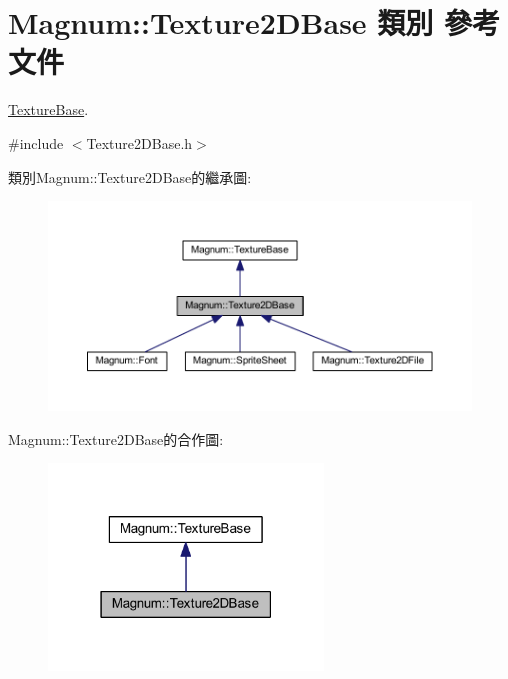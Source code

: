 \hypertarget{class_magnum_1_1_texture2_d_base}{}\section{Magnum\+:\+:Texture2\+D\+Base 類別 參考文件}
\label{class_magnum_1_1_texture2_d_base}


\hyperlink{class_magnum_1_1_texture_base}{Texture\+Base}.  




{\ttfamily \#include $<$Texture2\+D\+Base.\+h$>$}



類別\+Magnum\+:\+:Texture2\+D\+Base的繼承圖\+:\nopagebreak
\begin{figure}[H]
\begin{center}
\leavevmode
\includegraphics[width=350pt]{class_magnum_1_1_texture2_d_base__inherit__graph}
\end{center}
\end{figure}


Magnum\+:\+:Texture2\+D\+Base的合作圖\+:\nopagebreak
\begin{figure}[H]
\begin{center}
\leavevmode
\includegraphics[width=207pt]{class_magnum_1_1_texture2_d_base__coll__graph}
\end{center}
\end{figure}
